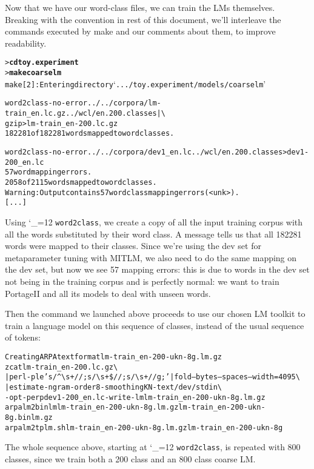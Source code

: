 \documentclass[11pt,letterpaper]{article}
\newcommand{\bs}{\textbackslash{}}
\newcommand{\PS}{PortageII\xspace}
\def\code{\begingroup\catcode`\_=12 \codex}
\newcommand{\codex}[1]{\texttt{#1}\endgroup}
\begin{document}
Now that we have our word-class files, we can train the LMs themselves.
Breaking with the convention in rest of this document, we'll
interleave the commands executed by make and our comments about them, to
improve readability.

\begin{small}
\begin{alltt}
   > \textbf{cd toy.experiment}
   > \textbf{make coarselm}
   make[2]: Entering directory `.../toy.experiment/models/coarselm'

   word2class -no-error ../../corpora/lm-train_en.lc.gz ../wcl/en.200.classes | \bs
      gzip > lm-train_en-200.lc.gz
   182281 of 182281 words mapped to word classes.

   word2class -no-error ../../corpora/dev1_en.lc ../wcl/en.200.classes > dev1-200_en.lc
   57 word mapping errors.
   2058 of 2115 words mapped to word classes.
   Warning: Output contains 57 word class mapping errors (<unk>).
   [...]
\end{alltt}
\end{small}

Using \code{word2class}, we create a copy of all the input training corpus with
all the words substituted by their word class. A message tells us that all
182281 words were mapped to their classes. Since we're using the dev set for
metaparameter tuning with MITLM, we also need to do the same mapping on the dev
set, but now we see 57 mapping errors: this is due to words in the dev set not
being in the training corpus and is perfectly normal: we want to train \PS and
all its models to deal with unseen words.

Then the command we launched above proceeds to use our chosen LM toolkit to
train a language model on this sequence of classes, instead of the usual
sequence of tokens:
\begin{small}
\begin{alltt}
   Creating ARPA text format lm-train_en-200-ukn-8g.lm.gz
   zcat lm-train_en-200.lc.gz \bs
      | perl -ple 's/^{\bs}s+//; s/{\bs}s+\$//; s/{\bs}s+/ /g;' | fold --bytes --spaces --width=4095 \bs
      | estimate-ngram -order 8 -smoothing KN -text /dev/stdin \bs
           -opt-perp dev1-200_en.lc -write-lm lm-train_en-200-ukn-8g.lm.gz
   arpalm2binlm lm-train_en-200-ukn-8g.lm.gz lm-train_en-200-ukn-8g.binlm.gz
   arpalm2tplm.sh lm-train_en-200-ukn-8g.lm.gz lm-train_en-200-ukn-8g
\end{alltt}
\end{small}

The whole sequence above, starting at \code{word2class}, is repeated with 800
classes, since we train both a 200 class and an 800 class coarse LM.
\end{document}
